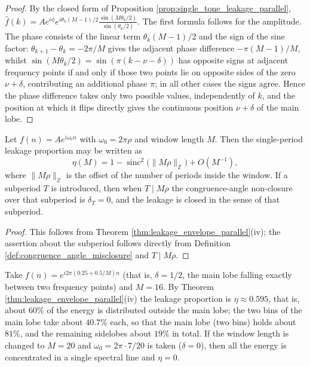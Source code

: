 \begin{proof}
By the closed form of Proposition \ref{prop:single_tone_leakage_parallel},
$\hat f(k)=Ae^{i\phi}e^{i\theta_k(M-1)/2}\frac{\sin(M\theta_k/2)}{\sin(\theta_k/2)}$. The first formula follows for the amplitude. The phase consists of the linear term $\theta_k(M-1)/2$ and the sign of the sine factor: $\theta_{k+1}-\theta_k=-2\pi/M$ gives the adjacent phase difference $-\pi(M-1)/M$, whilst $\sin(M\theta_k/2)=\sin(\pi(k-\nu-\delta))$ has opposite signs at adjacent frequency points if and only if those two points lie on opposite sides of the zero $\nu+\delta$, contributing an additional phase $\pi$; in all other cases the signs agree. Hence the phase difference takes only two possible values, independently of $k$, and the position at which it flips directly gives the continuous position $\nu+\delta$ of the main lobe.
\end{proof}

\begin{proposition}\label{prop:leakage_congruence_angle}
Let $f(n)=Ae^{i\omega_0 n}$ with $\omega_0=2\pi\rho$ and window length $M$. Then the single-period leakage proportion may be written as
\[
\eta(M)=1-\operatorname{sinc}^2\!\big(\|M\rho\|_{\mathbb{Z}}\big)+O(M^{-1}),
\]
where $\|M\rho\|_{\mathbb{Z}}$ is the offset of the number of periods inside the window. If a subperiod $T$ is introduced, then when $T\mid M\rho$ the congruence-angle non-closure over that subperiod is $\delta_T=0$, and the leakage is closed in the sense of that subperiod.
\end{proposition}

\begin{proof}
This follows from Theorem \ref{thm:leakage_envelope_parallel}(iv); the assertion about the subperiod follows directly from Definition \ref{def:congruence_angle_misclosure} and $T\mid M\rho$.
\end{proof}

\begin{example}\label{ex:rectangular_leakage_numeric}
Take $f(n)=e^{i2\pi(0.25+0.5/M)n}$ (that is, $\delta=1/2$, the main lobe falling exactly between two frequency points) and $M=16$. By Theorem \ref{thm:leakage_envelope_parallel}(iv) the leakage proportion is $\eta\approx0.595$, that is, about $60\%$ of the energy is distributed outside the main lobe; the two bins of the main lobe take about $40.7\%$ each, so that the main lobe (two bins) holds about $81\%$, and the remaining sidelobes about $19\%$ in total. If the window length is changed to $M=20$ and $\omega_0=2\pi\cdot7/20$ is taken ($\delta=0$), then all the energy is concentrated in a single spectral line and $\eta=0$.
\end{example}

